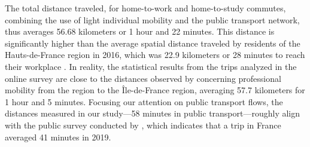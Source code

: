 \begin{refsegment}
The total distance traveled, for home-to-work and home-to-study commutes, combining the use of light individual mobility and the public transport network, thus averages 56.68 kilometers or 1 hour and 22 minutes. This distance is significantly higher than the average spatial distance traveled by residents of the Hauts-de-France region in 2016, which was 22.9 kilometers or 28 minutes to reach their workplace \textcolor{blue}{\autocite{insee_premiere_2016}}. In reality, the statistical results from the trips analyzed in the online survey are close to the distances observed by \textcolor{blue}{\textcite{insee_premiere_2016}} concerning professional mobility from the region to the Île-de-France region, averaging 57.7 kilometers for 1 hour and 5 minutes. Focusing our attention on public transport flows, the distances measured in our study—58 minutes in public transport—roughly align with the public survey conducted by \textcolor{blue}{\textcite{ministere_de_la_transition_ecologique_et_de_la_cohesion_des_territoires_mobilite_2023}}, which indicates that a  trip in France averaged 41 minutes in 2019.%


\end{refsegment}
